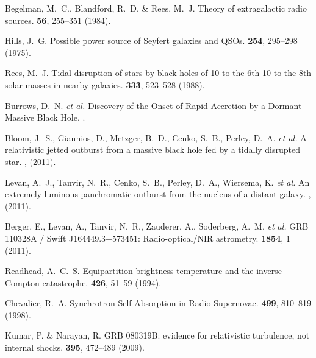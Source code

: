 \clearpage
\begin{thebibliography}{10}
 {Begelman},
M.~C., {Blandford}, R.~D.  \& {Rees}, M.~J. {Theory of extragalactic
radio sources}.   {\bf 56},
255--351 (1984).

 {Hills}, J.~G. {Possible power source of
Seyfert galaxies and QSOs}.   {\bf 254}, 295--298
(1975).

 {Rees}, M.~J. {Tidal disruption of stars by
black holes of 10 to the 6th-10 to the 8th solar masses in nearby
galaxies}.   {\bf 333}, 523--528 (1988).

 {Burrows}, D.~N. {\it
et al.} {Discovery of the Onset of Rapid Accretion by a Dormant
Massive Black Hole}.  .

 {Bloom}, J.~S., {Giannios},
D., {Metzger}, B.~D., {Cenko}, S.~B., {Perley}, D.~A. {\it et al.} {A
relativistic jetted outburst from a massive black hole fed by a
tidally disrupted star}.  , (2011).

 {Levan}, A.~J., {Tanvir},
N.~R., {Cenko}, S.~B., {Perley}, D.~A., {Wiersema}, K. {\it et al.}
{An extremely luminous panchromatic outburst from the nucleus of a
distant galaxy}.  , (2011).

 {Berger}, E., {Levan},
A., {Tanvir}, N.~R., {Zauderer}, A., {Soderberg}, A.~M.  {\it et al.}
{GRB 110328A / Swift J164449.3+573451: Radio-optical/NIR astrometry.}
 {\bf 1854},
1 (2011).

 {Readhead}, A.~C.~S. {Equipartition
brightness temperature and the inverse Compton catastrophe}.
 {\bf 426}, 51--59 (1994).

 {Chevalier}, R.~A. {Synchrotron
Self-Absorption in Radio Supernovae}.  
{\bf 499}, 810--819 (1998).

 {Kumar}, P. \& {Narayan},
R. {GRB 080319B: evidence for relativistic turbulence, not internal
shocks}.   {\bf 395}, 472--489
(2009).


\end{thebibliography}
